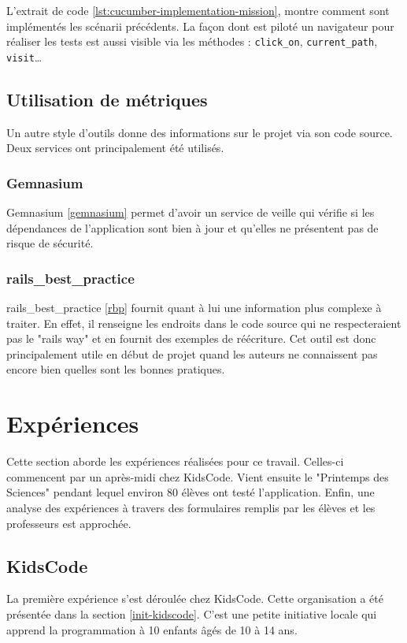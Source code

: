 L'extrait de code \ref{lst:cucumber-implementation-mission}, montre comment sont implémentés les scénarii précédents. La façon dont est piloté un navigateur pour réaliser les tests est aussi visible via les méthodes : \texttt{click\_on}, \texttt{current\_path}, \texttt{visit}\ldots

\subsection{Utilisation de métriques}
Un autre style d'outils donne des informations sur le projet via son code source. Deux services ont principalement été utilisés.

\subsubsection{Gemnasium}
Gemnasium \ref{gemnasium} permet d'avoir un service de veille qui vérifie si les dépendances de l'application sont bien à jour et qu'elles ne présentent pas de risque de sécurité.

\subsubsection{rails\_best\_practice}
rails\_best\_practice \ref{rbp} fournit quant à lui une information plus complexe à traiter. En effet, il renseigne les endroits dans le code source qui ne respecteraient pas le "rails way" et en fournit des exemples de réécriture. Cet outil est donc principalement utile en début de projet quand les auteurs ne connaissent pas encore bien quelles sont les bonnes pratiques.

\section{Expériences}
Cette section aborde les expériences réalisées pour ce travail. Celles-ci commencent par un après-midi chez KidsCode. Vient ensuite le "Printemps des Sciences" pendant lequel environ 80 élèves ont testé l'application. Enfin, une analyse des expériences à travers des formulaires remplis par les élèves et les professeurs est approchée.

\subsection{KidsCode}
\label{kidscode}
La première expérience s'est déroulée chez KidsCode. Cette organisation a été présentée dans la section \ref{init-kidscode}. C'est une petite initiative locale qui apprend la programmation à 10 enfants âgés de 10 à 14 ans.

